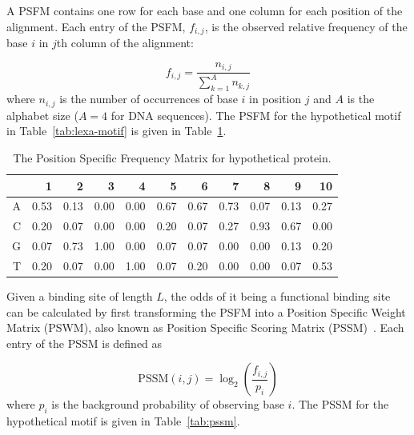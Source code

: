 A PSFM contains one row for each base and one column for each position of the
alignment. Each entry of the PSFM, $f_{i, j}$, is the observed relative
frequency of the base $i$ in $j$th column of the alignment:

\begin{equation}
  \label{eq:psfm}
  f_{i, j} = \frac{n_{i, j}}{\displaystyle\sum_{k=1}^A n_{k, j}}
\end{equation}
where $n_{i, j}$ is the number of occurrences of base $i$ in position $j$ and
$A$ is the alphabet size ($A=4$ for DNA sequences). The PSFM for the
hypothetical motif in Table~\ref{tab:lexa-motif} is given in
Table~\ref{tab:psfm}.

\begin{table}
  \centering
  \caption{The Position Specific Frequency Matrix for hypothetical protein.}
\label{tab:psfm}
  \begin{tabular}{|r|r|r|r|r|r|r|r|r|r|r|}
\hline
  &    1 &   2 &    3 &    4 &    5 &    6 &    7 &    8 &    9 & 10\\
\hline
A & 0.53 & 0.13 & 0.00 & 0.00 & 0.67 & 0.67 & 0.73 & 0.07 & 0.13 & 0.27 \\
\hline
C & 0.20 & 0.07 & 0.00 & 0.00 & 0.20 & 0.07 & 0.27 & 0.93 & 0.67 & 0.00 \\
\hline
G & 0.07 & 0.73 & 1.00 & 0.00 & 0.07 & 0.07 & 0.00 & 0.00 & 0.13 & 0.20 \\
\hline
T & 0.20 & 0.07 & 0.00 & 1.00 & 0.07 & 0.20 & 0.00 & 0.00 & 0.07 & 0.53 \\
\hline
  \end{tabular}
\end{table}

Given a binding site of length $L$, the odds of it being a functional binding
site can be calculated by first transforming the PSFM into a Position Specific
Weight Matrix (PSWM), also known as Position Specific Scoring Matrix
(PSSM)~\citep{stormo2000dna}. Each entry of the PSSM is defined as

\begin{equation}
  \label{eq:pssm}
  \mathrm{PSSM}(i, j) = \log_2\left(\frac{f_{i, j}}{p_i}\right)
\end{equation}
where $p_i$ is the background probability of observing base $i$. The PSSM for
the hypothetical motif is given in Table~\ref{tab:pssm}.

